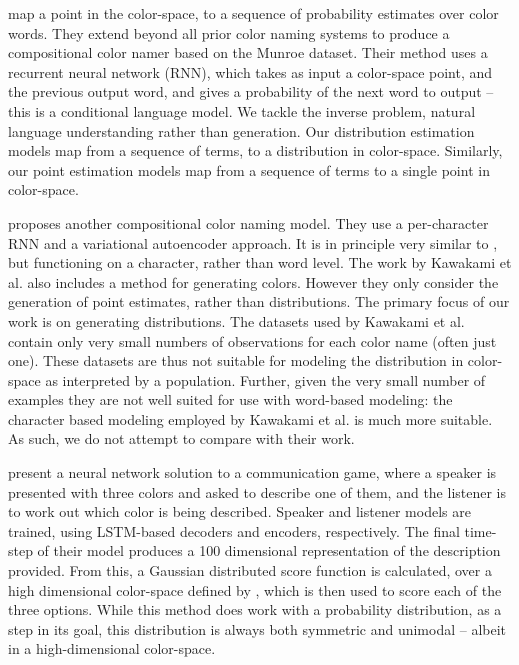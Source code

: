 \textcite{2016arXiv160603821M} map a point in the color-space, to a sequence of probability estimates over color words.
They extend beyond all prior color naming systems to produce a compositional color namer based on the Munroe dataset.
Their method uses a recurrent neural network (RNN), which takes as input a color-space point, and the previous output word, and gives a probability of the next word to output -- this is a conditional language model.
We tackle the inverse problem, natural language understanding rather than generation.
Our distribution estimation models map from a sequence of terms, to a distribution in color-space.
Similarly, our point estimation models map from a sequence of terms to a single point in color-space.


\textcite{DBLP:journals/corr/KawakamiDRS16} proposes another compositional color naming model.
They use a per-character RNN and a variational autoencoder approach.
It is in principle very similar to \textcite{2016arXiv160603821M}, but functioning on a character, rather than word level.
The work by Kawakami et al. also includes a method for generating colors.
However they only consider the generation of point estimates, rather than distributions.
The primary focus of our work is on generating distributions.
The datasets used by Kawakami et al. contain only very small numbers of observations for each color name (often just one).
These datasets are thus not suitable for modeling the distribution in color-space as interpreted by a population.
Further, given the very small number of examples they are not well suited for use with word-based modeling: the character based modeling employed by Kawakami et al. is much more suitable.
As such, we do not attempt to compare with their work.


\textcite{DBLP:journals/corr/MonroeHGP17} present a neural network solution to a communication game, where a speaker is presented with three colors and asked to describe one of them, and the listener is to work out which color is being described.
Speaker and listener models are trained, using LSTM-based decoders and encoders, respectively.
The final time-step of their model produces a 100 dimensional representation of the description provided.
From this, a Gaussian distributed score function is calculated, over a high dimensional color-space defined by \textcite{2016arXiv160603821M}, which is then used to score each of the three options.
While this method does work with a probability distribution, as a step in its goal,
this distribution is always both symmetric and unimodal -- albeit in a high-dimensional color-space.

